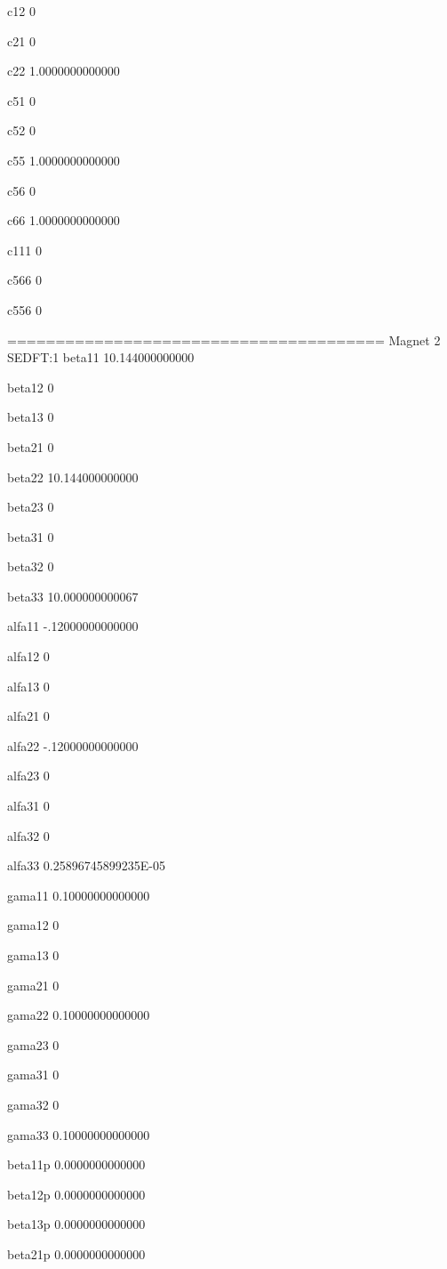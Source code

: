  c12
 0 
  
 c21
 0 
  
 c22
   1.0000000000000 
  
 c51
 0 
  
 c52
 0 
  
 c55
   1.0000000000000 
  
 c56
 0 
  
 c66
   1.0000000000000 
  
 c111
 0 
  
 c566
 0 
  
 c556
 0 
  
 =======================================
 Magnet            2  SEDFT:1         
 beta11 
   10.144000000000 
  
 beta12 
 0 
  
 beta13 
 0 
  
 beta21 
 0 
  
 beta22 
   10.144000000000 
  
 beta23 
 0 
  
 beta31 
 0 
  
 beta32 
 0 
  
 beta33 
   10.000000000067 
  
 alfa11 
  -.12000000000000 
  
 alfa12 
 0 
  
 alfa13 
 0 
  
 alfa21 
 0 
  
 alfa22 
  -.12000000000000 
  
 alfa23 
 0 
  
 alfa31 
 0 
  
 alfa32 
 0 
  
 alfa33 
  0.25896745899235E-05 
  
 gama11 
  0.10000000000000 
  
 gama12 
 0 
  
 gama13 
 0 
  
 gama21 
 0 
  
 gama22 
  0.10000000000000 
  
 gama23 
 0 
  
 gama31 
 0 
  
 gama32 
 0 
  
 gama33 
  0.10000000000000 
  
 beta11p
   0.0000000000000 
  
 beta12p
   0.0000000000000 
  
 beta13p
   0.0000000000000 
  
 beta21p
   0.0000000000000 
  
